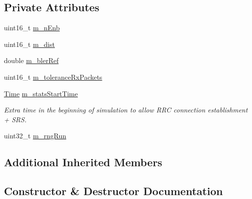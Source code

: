 \subsection*{Private Attributes}
\begin{DoxyCompactItemize}
\item 
uint16\+\_\+t \hyperlink{classLenaDlCtrlPhyErrorModelTestCase_a761b34bd4869ebf6d1a5bd78da392fbb}{m\+\_\+n\+Enb}
\item 
uint16\+\_\+t \hyperlink{classLenaDlCtrlPhyErrorModelTestCase_aa8b1b44353ecde326522c4cbe599aed1}{m\+\_\+dist}
\item 
double \hyperlink{classLenaDlCtrlPhyErrorModelTestCase_a3395f76e96e52bb60a7b0c6a5259019d}{m\+\_\+bler\+Ref}
\item 
uint16\+\_\+t \hyperlink{classLenaDlCtrlPhyErrorModelTestCase_aeea53cbe22fe11495e338820c8bd1515}{m\+\_\+tolerance\+Rx\+Packets}
\item 
\hyperlink{classns3_1_1Time}{Time} \hyperlink{classLenaDlCtrlPhyErrorModelTestCase_ad4a759a508657b7e2ea734e48e5cf387}{m\+\_\+stats\+Start\+Time}
\begin{DoxyCompactList}\small\item\em Extra time in the beginning of simulation to allow R\+RC connection establishment + S\+RS. \end{DoxyCompactList}\item 
uint32\+\_\+t \hyperlink{classLenaDlCtrlPhyErrorModelTestCase_ad755d559a1b44822080b2698bcc85fc1}{m\+\_\+rng\+Run}
\end{DoxyCompactItemize}
\subsection*{Additional Inherited Members}


\subsection{Constructor \& Destructor Documentation}
